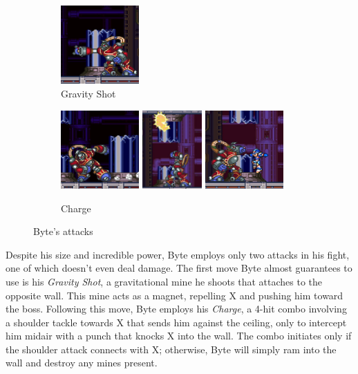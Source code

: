 \begin{figure}[htp]
	\centering
	\begin{subfigure}{.4\linewidth}
		\centering
		\includegraphics[height=3cm]{figures/X3/Enemies/byte_manget.jpg}
		\caption{Gravity Shot}
	\end{subfigure}
	\begin{subfigure}{\linewidth}
		\centering
		\includegraphics[height=3cm]{figures/X3/Enemies/byte_combo_1.jpg}
		\includegraphics[height=3cm]{figures/X3/Enemies/byte_combo_2.jpg}
		\includegraphics[height=3cm]{figures/X3/Enemies/byte_combo_3.jpg}
		\caption{Charge}
	\end{subfigure}
	\caption{Byte's attacks}
\end{figure}


Despite his size and incredible power, Byte employs only two attacks in his fight, one of which doesn't even deal damage. The first move Byte almost guarantees to use is his \emph{Gravity Shot}, a gravitational mine he shoots that attaches to the opposite wall. This mine acts as a magnet, repelling X and pushing him toward the boss. Following this move, Byte employs his \emph{Charge}, a 4-hit combo involving a shoulder tackle towards X that sends him against the ceiling, only to intercept him midair with a punch that knocks X into the wall. The combo initiates only if the shoulder attack connects with X; otherwise, Byte will simply ram into the wall and destroy any mines present.


